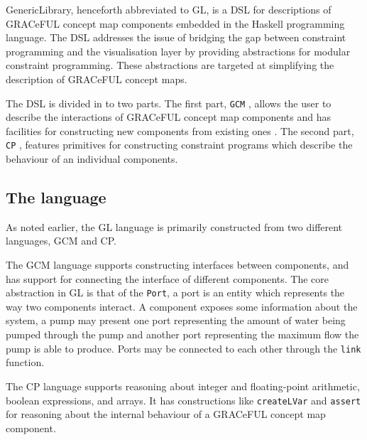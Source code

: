 GenericLibrary, henceforth abbreviated to GL, is a DSL for descriptions
of GRACeFUL concept map components embedded in the Haskell programming language.
The DSL addresses the issue of bridging the gap between constraint programming
and the visualisation layer by providing abstractions for modular constraint programming.
These abstractions are targeted at simplifying the description of GRACeFUL concept maps.

The DSL is divided in to two parts. The first part, \texttt{GCM} ,
allows the user to describe the interactions of GRACeFUL concept map components
and has facilities for constructing new components from existing ones . The second part,
\texttt{CP} , features primitives for constructing constraint programs
which describe the behaviour of an individual components.


\subsection{The language}
As noted earlier, the GL language is primarily constructed from two different languages,
GCM and CP.

The GCM language supports constructing interfaces between components,
and has support for connecting the interface of different components.
The core abstraction in GL is that of the \texttt{Port}, a port is an
entity which represents the way two components interact. A component
exposes some information about the system, a pump may present one port
representing the amount of water being pumped through the pump and another
port representing the maximum flow the pump is able to produce. Ports
may be connected to each other through the \texttt{link} function.

The CP language supports reasoning about integer and floating-point arithmetic, boolean expressions,
and arrays. It has constructions like \texttt{createLVar} and \texttt{assert} for reasoning about
the internal behaviour of a GRACeFUL concept map component.

